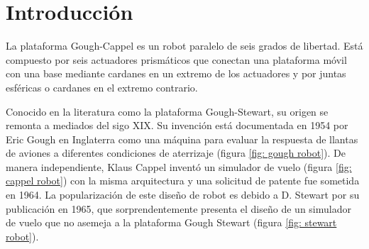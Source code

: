 \section{Introducción}

La plataforma Gough-Cappel es un robot paralelo de seis grados de libertad.
Está compuesto por seis actuadores prismáticos que conectan una plataforma
móvil con una base mediante cardanes en un extremo de los actuadores y por
juntas esféricas o cardanes en el extremo contrario. 


Conocido en la literatura como la 
plataforma Gough-Stewart, su origen se remonta a mediados del sigo XIX.
Su invención está documentada en 1954 por Eric Gough 
\cite{gough} en Inglaterra como una máquina para 
evaluar la respuesta de llantas de aviones a diferentes 
condiciones de aterrizaje (figura \ref{fig: gough robot}). 
De manera independiente, Klaus Cappel inventó un simulador de vuelo (figura \ref{fig: cappel robot})
con la misma arquitectura y una solicitud de patente 
fue sometida en 1964.
La popularización de este diseño de robot es debido a D. Stewart 
por su publicación en 1965, que sorprendentemente presenta el
diseño de un simulador de vuelo que no asemeja a la 
plataforma Gough Stewart (figura \ref{fig: stewart robot}).



